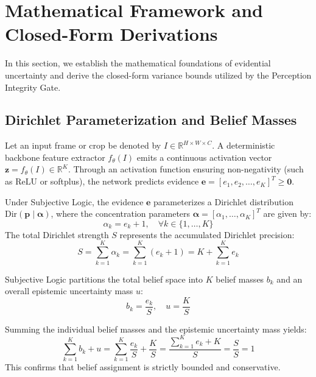 \documentclass[10pt,journal,compsoc]{IEEEtran}
\begin{document}
\section{Mathematical Framework and Closed-Form Derivations}
In this section, we establish the mathematical foundations of evidential uncertainty and derive the closed-form variance bounds utilized by the Perception Integrity Gate.

\subsection{Dirichlet Parameterization and Belief Masses}
Let an input frame or crop be denoted by $I \in \mathbb{R}^{H \times W \times C}$. A deterministic backbone feature extractor $f_\theta(I)$ emits a continuous activation vector $\mathbf{z} = f_\theta(I) \in \mathbb{R}^K$. Through an activation function ensuring non-negativity (such as $\text{ReLU}$ or softplus), the network predicts evidence $\mathbf{e} = [e_1, e_2, \dots, e_K]^T \ge \mathbf{0}$.

Under Subjective Logic, the evidence $\mathbf{e}$ parameterizes a Dirichlet distribution $\text{Dir}(\mathbf{p} \mid \boldsymbol{\alpha})$, where the concentration parameters $\boldsymbol{\alpha} = [\alpha_1, \dots, \alpha_K]^T$ are given by:
\begin{equation}
\alpha_k = e_k + 1, \quad \forall k \in \{1, \dots, K\}
\end{equation}
The total Dirichlet strength $S$ represents the accumulated Dirichlet precision:
\begin{equation}
S = \sum_{k=1}^K \alpha_k = \sum_{k=1}^K (e_k + 1) = K + \sum_{k=1}^K e_k
\end{equation}

Subjective Logic partitions the total belief space into $K$ belief masses $b_k$ and an overall epistemic uncertainty mass $u$:
\begin{equation}
b_k = \frac{e_k}{S}, \quad u = \frac{K}{S}
\end{equation}
\begin{IEEEproof}
Summing the individual belief masses and the epistemic uncertainty mass yields:
\begin{equation}
\sum_{k=1}^K b_k + u = \sum_{k=1}^K \frac{e_k}{S} + \frac{K}{S} = \frac{\sum_{k=1}^K e_k + K}{S} = \frac{S}{S} = 1
\end{equation}
This confirms that belief assignment is strictly bounded and conservative.
\end{IEEEproof}
\end{document}
